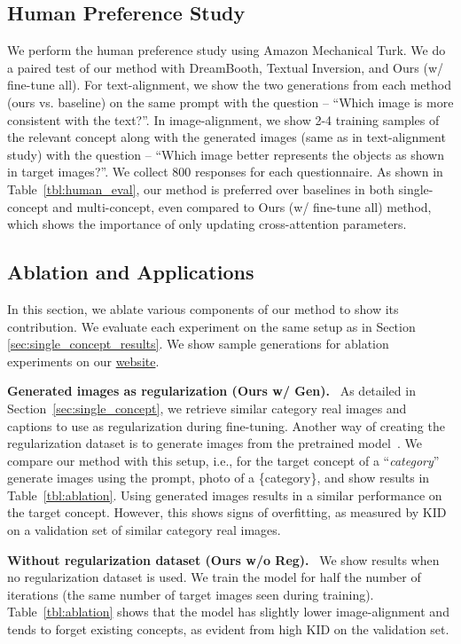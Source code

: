 \subsection{Human Preference Study} We perform the human preference study using Amazon Mechanical Turk. We do a paired test of our method with DreamBooth, Textual Inversion, and Ours (w/ fine-tune all). For text-alignment, we show the two generations from each method (ours vs. baseline) on the same prompt with the question -- ``Which image is more consistent with the text?''. In image-alignment, we show 2-4 training samples of the relevant concept along with the generated images (same as in text-alignment study) with the question -- ``Which image better represents the objects as shown in target images?''. We collect $800$ responses for each questionnaire. As shown in Table~\ref{tbl:human_eval}, our method is preferred over baselines in both single-concept and multi-concept, even compared to Ours (w/ fine-tune all) method, which shows the importance of only updating cross-attention parameters.

\subsection{Ablation and Applications}\label{sec:ablation}
In this section, we ablate various components of our method to show its contribution. We evaluate each experiment on the same setup as in Section \ref{sec:single_concept_results}. We show sample generations for ablation experiments on our \href{https://www.cs.cmu.edu/~custom-diffusion/}{website}.

  \textbf{Generated images as regularization (Ours w/ Gen).} \ 
As detailed in Section~\ref{sec:single_concept}, we retrieve similar category real images and captions to use as regularization during fine-tuning. Another way of creating the regularization dataset is to generate images from the pretrained model~\cite{ruiz2022dreambooth}. We compare our method with this setup, i.e., for the target concept of a ``\textit{category}'' generate images using the prompt, {\menlo photo of a \{category\}}, and show results in Table~\ref{tbl:ablation}. Using generated images results in a similar performance on the target concept. However, this shows signs of overfitting, as measured by KID on a validation set of similar category real images.

  \textbf{Without regularization dataset (Ours w/o Reg).} \ 
We show results when no regularization dataset is used. We train the model for half the number of iterations (the same number of target images seen during training). Table~\ref{tbl:ablation} shows that the model has slightly lower image-alignment and tends to forget existing concepts, as evident from high KID on the validation set.

